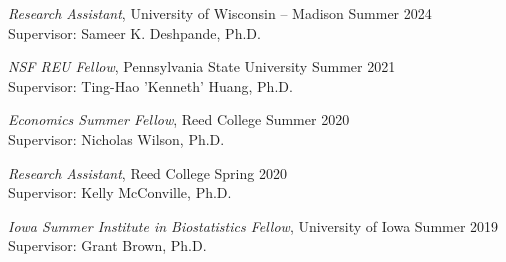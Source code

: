 \documentclass[margin]{res}
\begin{document}
\begin{resume}
\emph{Research Assistant}, University of Wisconsin -- Madison \hfill Summer 2024 \\
Supervisor: Sameer K. Deshpande, Ph.D.

\emph{NSF REU Fellow}, Pennsylvania State University \hfill Summer 2021 \\
Supervisor: Ting-Hao 'Kenneth' Huang, Ph.D.

\emph{Economics Summer Fellow}, Reed College \hfill Summer 2020 \\
Supervisor: Nicholas Wilson, Ph.D.

\emph{Research Assistant}, Reed College \hfill Spring 2020 \\
Supervisor: Kelly McConville, Ph.D.

\emph{Iowa Summer Institute in Biostatistics Fellow}, University of Iowa \hfill Summer 2019 \\
Supervisor: Grant Brown, Ph.D.


\end{resume} 
\end{document}
